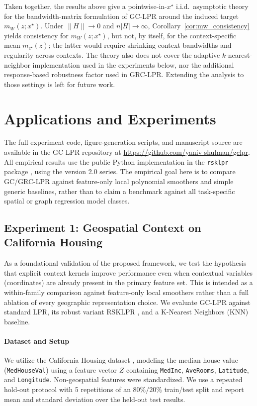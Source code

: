 \documentclass[final,1p,times,authoryear]{elsarticle}
\begin{document}
Taken together, the results above give a pointwise-in-\(x^\star\) i.i.d.\ asymptotic theory for the bandwidth-matrix formulation of GC-LPR around the induced target \(m_W(z;x^\star)\). Under \(\|H\|\to0\) and \(n|H|\to\infty\), Corollary~\ref{cor:mw_consistency} yields consistency for \(m_W(z;x^\star)\), but not, by itself, for the context-specific mean \(m_{c^\star}(z)\); the latter would require shrinking context bandwidths and regularity across contexts. The theory also does not cover the adaptive \(k\)-nearest-neighbor implementation used in the experiments below, nor the additional response-based robustness factor used in GRC-LPR. Extending the analysis to those settings is left for future work.

\section{Applications and Experiments}
\label{s:Experiments}
The full experiment code, figure-generation scripts, and manuscript source are available in the GC-LPR repository at \url{https://github.com/yaniv-shulman/gclpr}.
All empirical results use the public Python implementation in the \texttt{rsklpr} package \citep{shulman2026rsklpr}, using the version 2.0 series.
The empirical goal here is to compare GC/GRC-LPR against feature-only local polynomial smoothers and simple generic baselines, rather than to claim a benchmark against all task-specific spatial or graph regression model classes.
\subsection{Experiment 1: Geospatial Context on California Housing}

As a foundational validation of the proposed framework, we test the hypothesis that explicit context kernels improve performance even when contextual variables (coordinates) are already present in the primary feature set. This is intended as a within-family comparison against feature-only local smoothers rather than a full ablation of every geographic representation choice. We evaluate GC-LPR against standard LPR, its robust variant RSKLPR \citep{shulman2025robust}, and a K-Nearest Neighbors (KNN) baseline.

\paragraph{\textbf{Dataset and Setup}}
We utilize the California Housing dataset \citep{pace1997sparse}, modeling the median house value (\texttt{MedHouseVal}) using a feature vector $Z$ containing \texttt{MedInc}, \texttt{AveRooms}, \texttt{Latitude}, and \texttt{Longitude}. Non-geospatial features were standardized. We use a repeated hold-out protocol with 5 repetitions of an \(80\%/20\%\) train/test split and report mean and standard deviation over the held-out test results.
\end{document}

